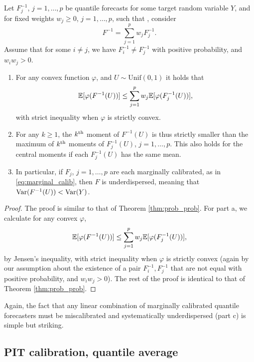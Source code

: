 \documentclass{article}
\begin{document}
\begin{theorem}
\label{thm:marginal_quant}
Let $F_j^{-1}$, $j=1,\dots,p$ be quantile forecasts for some target random
variable $Y$, and for fixed weights $w_j \geq 0$, $j=1,\dots,p$, such that
, consider   
\[
F^{-1} = \sum_{j=1}^p w_j F_j^{-1}.
\]
Assume that for some $i \not= j$, we have $F_i^{-1} \not= F_j^{-1}$ with
positive probability, and $w_iw_j > 0$. 

\begin{enumerate}[label=\alph*.]
\item For any convex function $\varphi$, and $U \sim \mathrm{Unif}(0,1)$ it
  holds that 
\[
\mathbb{E}[\varphi(F^{-1}(U))] \leq \sum_{j=1}^p w_j \mathbb{E}[\varphi(F_j^{-1}(U))], 
\]
with strict inequality when $\varphi$ is strictly convex.

\item For any $k \geq 1$, the $k^{\text{th}}$ moment of $F^{-1}(U)$ is thus strictly
  smaller than the maximum of $k^{\text{th}}$ moments of $F_j^{-1}(U)$,
  $j=1,\dots,p$. This also holds for the central moments if each $F_j^{-1}(U)$
  has the same mean. 

\item In particular, if $F_j$, $j=1,\dots,p$ are each marginally calibrated, as
  in \eqref{eq:marginal_calib}, then $F$ is underdispersed, meaning 
  that $\mathrm{Var}(F^{-1}(U)) < \mathrm{Var}(Y)$.
\end{enumerate}
\end{theorem}

\begin{proof}
The proof is similar to that of Theorem \ref{thm:prob_prob}. For part a, we
calculate for any convex $\varphi$,   
\[
\mathbb{E}[\varphi(F^{-1}(U))] \leq \sum_{j=1}^p w_j \mathbb{E}[\varphi(F_j^{-1}(U))],
\]
by Jensen's inequality, with strict inequality when $\varphi$ is strictly 
convex (again by our assumption about the existence of a pair
$F_i^{-1},F_j^{-1}$ that are not equal with positive probability, and
$w_iw_j>0$). The rest of the proof is identical to that of Theorem
\ref{thm:prob_prob}.  
\end{proof}

Again, the fact that any linear combination of marginally calibrated quantile
forecasters must be miscalibrated and systematically underdispersed (part c) is
simple but striking.

\subsection{PIT calibration, quantile average}
\end{document}
